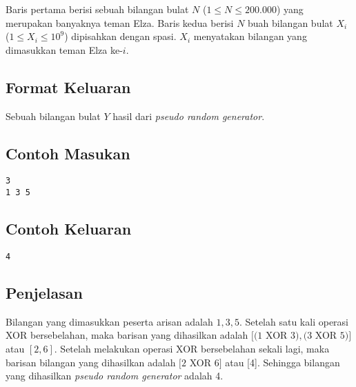 \documentclass{article}
\begin{document}
Baris pertama berisi sebuah bilangan bulat $N$ ($1 \leq N \leq 200.000$) yang merupakan banyaknya teman Elza.
Baris kedua berisi $N$ buah bilangan bulat $X_i$ ($1 \leq X_i \leq 10^{9}$) dipisahkan dengan spasi. $X_i$ menyatakan bilangan yang dimasukkan teman Elza ke-$i$.

\subsection*{Format Keluaran}

Sebuah bilangan bulat $Y$ hasil dari  \textit{pseudo random generator}.
\\

\begin{multicols}{2}
\subsection*{Contoh Masukan}
\begin{lstlisting}
3
1 3 5
\end{lstlisting}
\columnbreak
\subsection*{Contoh Keluaran}
\begin{lstlisting}
4
\end{lstlisting}
\vfill
\null
\end{multicols}

\subsection*{Penjelasan}
Bilangan yang dimasukkan peserta arisan adalah $1, 3, 5$. 
Setelah satu kali operasi XOR bersebelahan, maka barisan yang dihasilkan adalah $[(1$ XOR $3), (3$ XOR $5)]$ atau  $[2, 6]$. Setelah melakukan operasi XOR bersebelahan sekali lagi, maka barisan bilangan yang dihasilkan adalah $[2$ XOR $6]$ atau [4]. Sehingga bilangan yang dihasilkan \textit{pseudo random generator} adalah 4.


\pagebreak
\end{document}
